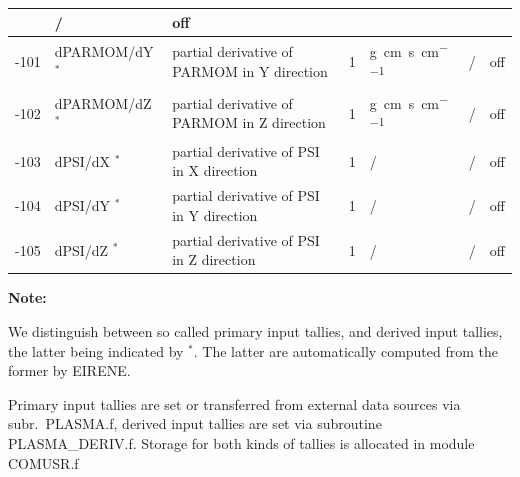 \begin{landscape}
\begin{longtable}{|r|l|l|l|l|c|c|}
			   & /              & off
    \\ \hline
    -101                   & dPARMOM/dY $^*$
                           & partial derivative of PARMOM in Y direction
                           & 1                            & \si{\gram\centi\metre\per\second\per\centi\metre}
			   & /              & off
    \\ \hline
    -102                   & dPARMOM/dZ $^*$
                           & partial derivative of PARMOM in Z direction
                           & 1                            & \si{\gram\centi\metre\per\second\per\centi\metre}
			   & /              & off
    \\ \hline
    -103                   & dPSI/dX $^*$
                           & partial derivative of PSI in X direction
                           & 1                            & /
			   & /              & off
    \\ \hline
    -104                   & dPSI/dY $^*$
                           & partial derivative of PSI in Y direction
                           & 1                            & /
			   & /              & off
    \\ \hline
    -105                   & dPSI/dZ $^*$
                           & partial derivative of PSI in Z direction
                           & 1                            & /
			   & /              & off
    \\ \hline
  \end{longtable}

  \textbf{Note:}

  We distinguish between so called primary input tallies, and derived input
  tallies, the latter being indicated by $^*$.
  The latter are automatically computed from the former by EIRENE.

  Primary input tallies are set or transferred from external data sources via
  subr.\ PLASMA.f, derived input tallies are set via subroutine PLASMA\_DERIV.f.
  Storage for both kinds of tallies is allocated in module COMUSR.f


\end{landscape}
